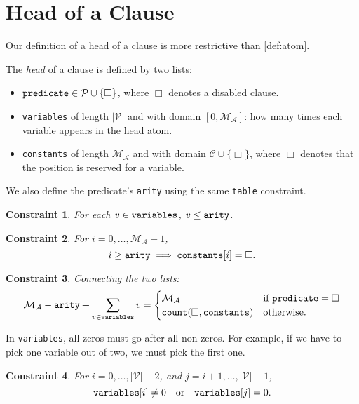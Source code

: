 \documentclass[runningheads]{llncs}
\newtheorem{constraint}{Constraint}
\newcommand{\variable}[1]{\texttt{\textup{#1}}}
\newcommand{\predicates}{\mathcal{P}}
\newcommand{\variables}{\mathcal{V}}
\newcommand{\constants}{\mathcal{C}}
\newcommand{\maxArity}{\mathcal{M}_{\mathcal{A}}}
\begin{document}
\section{Head of a Clause}

Our definition of a head of a clause is more restrictive than \cref{def:atom}.

\begin{definition} %
  The \emph{head} of a clause is defined by two lists:
  \begin{itemize}
  \item $\variable{predicate} \in \predicates \cup \{ \Box \}$, where $\Box$
    denotes a disabled clause.
  \item \variable{variables} of length $|\variables{}|$ and with domain
    $[0, \maxArity{}]$: how many times each variable appears in the head atom.
  \item \variable{constants} of length $\maxArity{}$ and with domain
    $\constants{} \cup \{ \Box \}$, where $\Box$ denotes that the position is
    reserved for a variable.
  \end{itemize}
  We also define the predicate's \variable{arity} using the same
  \variable{table} constraint.
\end{definition}

\begin{constraint}
  For each $v \in \variable{variables}$, $v \le \variable{arity}$.
\end{constraint}

\begin{constraint}
  For $i = 0, \dots, \maxArity{} - 1$,
  \[
    i \ge \variable{arity} \implies \variable{constants}[i] = \Box.
  \]
\end{constraint}

\begin{constraint}
  Connecting the two lists:
  \[
    \maxArity{} - \variable{arity} + \sum_{v \in \variable{variables}} v
    = \begin{cases}
      \maxArity{} & \text{if } \variable{predicate} = \Box \\
      \variable{count}(\Box, \variable{constants}) & \text{otherwise}.
      \end{cases}
  \]
\end{constraint}

In \variable{variables}, all zeros must go after all non-zeros. For example,
if we have to pick one variable out of two, we must pick the first one.
\begin{constraint}
  For $i = 0, \dots, |\variables{}| - 2$, and $j = i + 1, \dots,
  |\variables{}| - 1$,
  \[
    \variable{variables}[i] \ne 0 \quad \text{or} \quad \variable{variables}[j]
    = 0.
  \]
\end{constraint}
\end{document}
